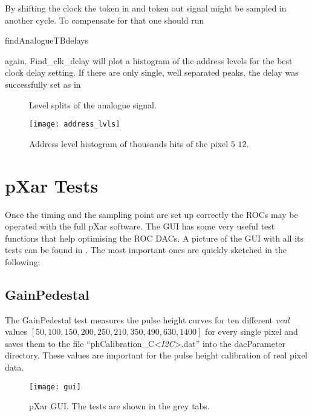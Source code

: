 By shifting the clock the token in and token out signal might be sampled in another cycle. To compensate for that one should run 
\begin{itemize}
	\tri \ubuntu findAnalogueTBdelays
\end{itemize}
again. Find\_clk\_delay will plot a histogram of the address levels for the best clock delay setting. If there are only single, well separated peaks, the delay was successfully set as in 
\begin{figure}[ht]
	\centering
	\hfill
	\caption{Level splits of the analogue signal.}
	\label{psplits}
\end{figure}\no
\begin{figure}[ht]
	\centering
	\texttt{[image: address\_lvls]}
	\caption{Address level histogram of thousands hits of the pixel $5$ $12$.}
	\label{padrlev}
\end{figure}\no
\section{pXar Tests}
Once the timing and the sampling point are set up correctly the \ac{ROC}s may be operated with the full pXar software. The \ac{GUI} has some very useful test functions that help optimising the \ac{ROC} \ac{DAC}s. A picture of the \ac{GUI} with all its tests can be found in . The most important ones are quickly sketched in the following:
\subsection{GainPedestal}\label{sgainped}
The GainPedestal test measures the pulse height curves for ten different \textit{vcal} values $[50, 100, 150, 200, 250, 210, 350, 490, 630, 1400]$ for every single pixel and saves them to the file ``phCalibration\_C<\textit{\ac{I2C}}>.dat'' into the dacParameter directory. These values are important for the pulse height calibration of real pixel data.
\begin{figure}[ht]
	\centering
	\texttt{[image: gui]}
	\caption{pXar \ac{GUI}. The tests are shown in the grey tabs.}
	\label{pgui}
\end{figure}\no
